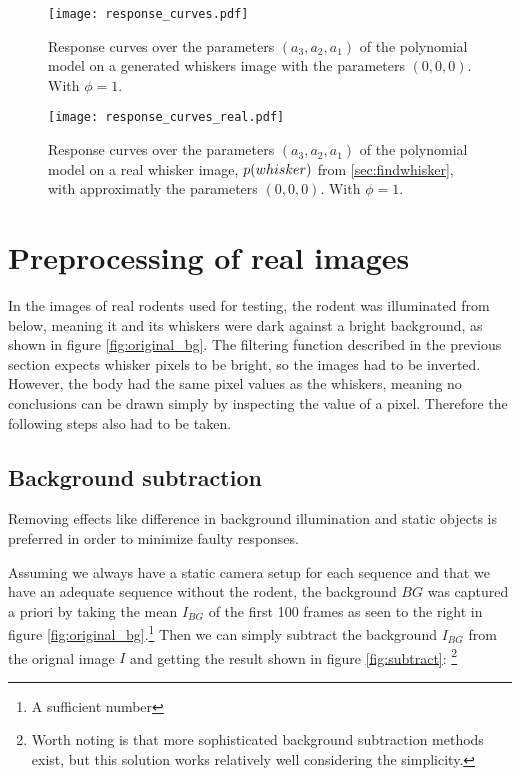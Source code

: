 \begin{figure}
    \centering
    \texttt{[image: response\_curves.pdf]}
    \caption{
        Response curves over the parameters $(a_3,a_2,a_1)$ of the polynomial model on a generated whiskers image with the parameters $(0,0,0)$. With $\phi=1$.
    }
    \label{fig:response_generated}
\end{figure}
\begin{figure}
    \centering
    \texttt{[image: response\_curves\_real.pdf]}
    \caption{
        Response curves over the parameters $(a_3,a_2,a_1)$ of the polynomial model on a real whisker image, $p{(whisker)}$ from \ref{sec:findwhisker},
        with approximatly the parameters $(0,0,0)$. With $\phi=1$.
    }
    \label{fig:response_real}
\end{figure}

\section{Preprocessing of real images}
\label{prep-real}

In the images of real rodents used for testing, the rodent was
illuminated from below, meaning it and its whiskers were dark against
a bright background, as shown in figure \ref{fig:original_bg}. The filtering function described in the previous
section expects whisker pixels to be bright, so the images had to be
inverted. However, the body had the same pixel values as the whiskers,
meaning no conclusions can be drawn simply by inspecting the value of
a pixel. Therefore the following steps also had to be taken.

\subsection{Background subtraction}
Removing effects like difference in background illumination and static
objects is preferred in order to minimize faulty responses.

Assuming we always have a static camera setup for each sequence and
that we have an adequate sequence without the rodent, the background
$BG$ was captured a priori by taking the mean $I_{BG}$ of the first
100 frames as seen to the right in figure \ref{fig:original_bg}.\footnote{A sufficient number} Then we can simply subtract
the background $I_{BG}$ from the orignal image $I$ and getting the result shown in figure \ref{fig:subtract}: \footnote{Worth
noting is that more sophisticated background subtraction methods
exist, but this solution works relatively well considering the
simplicity.}

